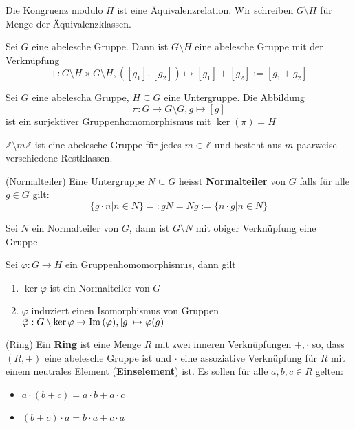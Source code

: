 \documentclass[../Algebra_script.tex]{subfiles}
\begin{document}
\begin{proposition}
	Die Kongruenz modulo $H$ ist eine Äquivalenzrelation. Wir schreiben $G\setminus H$ für Menge der Äquivalenzklassen.
\end{proposition}

\begin{proposition}
	Sei $G$ eine abelesche Gruppe. Dann ist $G\setminus H$ eine abelesche Gruppe mit der Verknüpfung
	\[+ : G\setminus H \times G\setminus H, ([g_1],[g_2]) \mapsto [g_1] + [g_2] := [g_1 + g_2]\]
\end{proposition}

\begin{lemma}
	Sei $G$ eine abelescha Gruppe, $H \subseteq G$ eine Untergruppe. Die Abbildung
	\[\pi : G \to G\setminus G, g \mapsto [g]\]
	ist ein surjektiver Gruppenhomomorphismus mit $\ker(\pi) = H$
\end{lemma}

\begin{corollary}
	$\mathbb{Z} \setminus m\mathbb{Z}$ ist eine abelesche Gruppe für jedes $m \in \mathbb{Z}$ und besteht aus $m$ paarweise verschiedene Restklassen.
\end{corollary}

\begin{definition}{(Normalteiler)}
	Eine Untergruppe $N \subseteq G$ heisst \textbf{Normalteiler} von $G$ falls für alle $g \in G$ gilt:
	\[\{g \cdot n | n \in N\} =: gN = Ng := \{n \cdot g | n \in N\}\]
\end{definition}

\begin{proposition}
	Sei $N$ ein Normalteiler von $G$, dann ist $G \setminus N$ mit obiger Verknüpfung eine Gruppe.
\end{proposition}

\begin{proposition}
	Sei $\varphi : G \to H$ ein Gruppenhomomorphismus, dann gilt
	\begin{enumerate}
		\item $\ker{\varphi}$ ist ein Normalteiler von $G$
		\item $\varphi$ induziert einen Isomorphismus von Gruppen $\bar{\varphi}: G\setminus \ker{\varphi} \to \operatorname{Im}{(\varphi)}, [g] \mapsto \varphi(g)$
	\end{enumerate}
\end{proposition}

\begin{definition}{(Ring)}
	Ein \textbf{Ring} ist eine Menge $R$ mit zwei inneren Verknüpfungen $+, \cdot$ so, dass $(R, +)$ eine abelesche Gruppe ist und $\cdot$ eine assoziative Verknüpfung für $R$ mit einem neutrales Element (\textbf{Einselement}) ist. Es sollen für alle $a, b, c \in R$ gelten:
	\begin{itemize}
		\item $a \cdot (b + c) = a \cdot b + a \cdot c$
		\item $(b + c) \cdot a = b \cdot a + c \cdot a$
	\end{itemize}
\end{definition}
\end{document}
